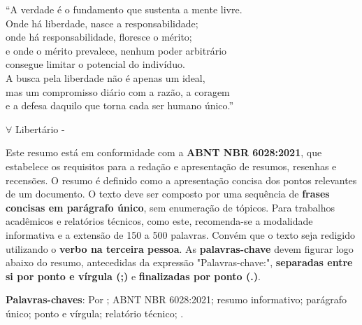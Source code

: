 \documentclass{Arquivos/AcademicoPadrao}
\begin{document}
\begin{epigrafe}
    ``A verdade é o fundamento que sustenta a mente livre.\\
    Onde há liberdade, nasce a responsabilidade;\\
    onde há responsabilidade, floresce o mérito;\\
    e onde o mérito prevalece, nenhum poder arbitrário\\
    consegue limitar o potencial do indivíduo.\\
    A busca pela liberdade não é apenas um ideal,\\
    mas um compromisso diário com a razão, a coragem\\
    e a defesa daquilo que torna cada ser humano único.''
    
    $\forall$ Libertário - \WenesTex
\end{epigrafe}




\begin{resumo}
Este resumo está em conformidade com a \textbf{ABNT NBR 6028:2021}, que estabelece os requisitos para a redação e apresentação de resumos, resenhas e recensões. O resumo é definido como a apresentação concisa dos pontos relevantes de um documento. O texto deve ser composto por uma sequência de \textbf{frases concisas em parágrafo único}, sem enumeração de tópicos. Para trabalhos acadêmicos e relatórios técnicos, como este, recomenda-se a modalidade informativa e a extensão de 150 a 500 palavras. Convém que o texto seja redigido utilizando o \textbf{verbo na terceira pessoa}. As \textbf{palavras-chave} devem figurar logo abaixo do resumo, antecedidas da expressão "Palavras-chave:", \textbf{separadas entre si por ponto e vírgula (;)} e \textbf{finalizadas por ponto (.)}.

\textbf{Palavras-chaves}: Por \WenesTex; ABNT NBR 6028:2021; resumo informativo; parágrafo único; ponto e vírgula; relatório técnico; \abnTexUFT.
\end{resumo}


\begin{resumoEN}

\end{resumoEN}


\listaDeFiguras
\listaDeTabelas
\end{document}
